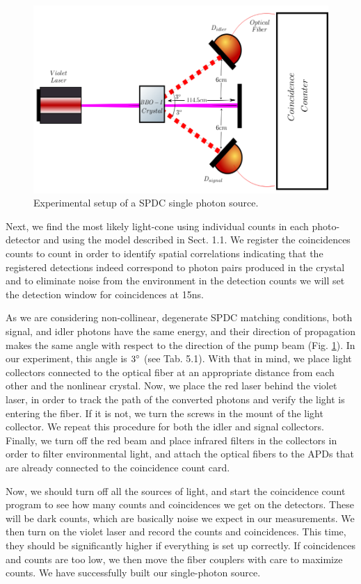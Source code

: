 \documentclass[12pt]{book}
\begin{document}
\begin{figure}[t!]
\centering
\includegraphics[scale=0.3]{images/sPDC.png}
\caption{Experimental setup of a SPDC single photon source.}
\label{single}
\end{figure}

Next, we find the most likely light-cone using individual counts in each photo-detector and using the model described in Sect. 1.1. We register the coincidences counts to count in order to identify spatial correlations indicating that the registered detections indeed correspond to photon pairs produced in the crystal and to eliminate noise from the environment in the detection counts we will set the detection window for coincidences at 15ns.

 As we are considering non-collinear, degenerate SPDC matching conditions, both signal, and idler photons have the same energy, and their direction of propagation makes the same angle with respect to the direction of the pump beam (Fig. \ref{single}). In our experiment, this angle is $3\degree$ (see Tab. 5.1). With that in mind, we place light collectors connected to the optical fiber at an appropriate distance from each other and the nonlinear crystal. Now, we place the red laser behind the violet laser, in order to track the path of the converted photons and verify the light is entering the fiber. If it is not, we turn the screws in the mount of the light collector. We repeat this procedure for both the idler and signal collectors. Finally, we turn off the red beam and place infrared filters in the collectors in order to filter environmental light, and attach the optical fibers to the APDs that are already connected to the coincidence count card.

Now, we should turn off all the sources of light, and start the coincidence count program to see how many counts and coincidences we get on the detectors. These will be dark counts, which are basically noise we expect in our measurements. We then turn on the violet laser and record the counts and coincidences. This time, they should be significantly higher if everything is set up correctly. If coincidences and counts are too low, we then move the fiber couplers with care to maximize counts. We have successfully built our single-photon source.
\end{document}
